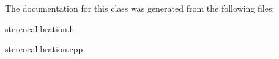 The documentation for this class was generated from the following files\+:\begin{DoxyCompactItemize}
\item 
stereocalibration.\+h\item 
stereocalibration.\+cpp\end{DoxyCompactItemize}
